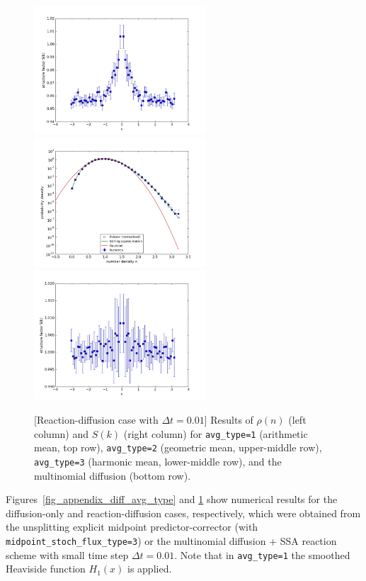 \documentclass{article}
\begin{document}
\begin{figure}
\includegraphics[width=0.5\linewidth,height=1.9in]{fig1/appendix_dt0.01_react_Sk_avg3.jpg}
\includegraphics[width=0.5\linewidth,height=1.9in]{fig1/appendix_dt0.01_react_hist_mn_ssa.jpg}
\includegraphics[width=0.5\linewidth,height=1.9in]{fig1/appendix_dt0.01_react_Sk_mn_ssa.jpg}
\caption{\label{fig_appendix_react_avg_type}[Reaction-diffusion case with $\Delta t=0.01$] Results of $\rho(n)$ (left column) and $S(k)$ (right column) for \texttt{avg\_type=1} (arithmetic mean, top row), \texttt{avg\_type=2} (geometric mean, upper-middle row), \texttt{avg\_type=3} (harmonic mean, lower-middle row), and the multinomial diffusion (bottom row).
}
\end{figure}

Figures~\ref{fig_appendix_diff_avg_type} and \ref{fig_appendix_react_avg_type} show numerical results for the diffusion-only and reaction-diffusion cases, respectively, which were obtained from the unsplitting explicit midpoint predictor-corrector (with \texttt{midpoint\_stoch\_flux\_type=3}) or the multinomial diffusion + SSA reaction scheme with small time step $\Delta t=0.01$.
Note that in \texttt{avg\_type=1} the smoothed Heaviside function $H_1(x)$ is applied.
\end{document}
